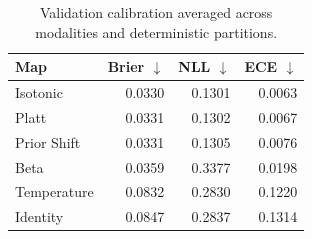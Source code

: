 \begin{table}[t]
\centering
\caption{Validation calibration averaged across modalities and deterministic partitions.}
\label{tab:calibration}
\begin{tabular}{lrrr}
\toprule
Map & Brier $\downarrow$ & NLL $\downarrow$ & ECE $\downarrow$ \\
\midrule
Isotonic & 0.0330 & 0.1301 & 0.0063 \\
Platt & 0.0331 & 0.1302 & 0.0067 \\
Prior Shift & 0.0331 & 0.1305 & 0.0076 \\
Beta & 0.0359 & 0.3377 & 0.0198 \\
Temperature & 0.0832 & 0.2830 & 0.1220 \\
Identity & 0.0847 & 0.2837 & 0.1314 \\
\bottomrule
\end{tabular}
\end{table}
